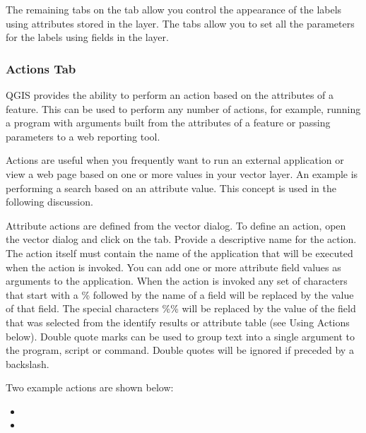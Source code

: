 The remaining tabs on the  tab allow you control the appearance of the
labels using attributes stored in the layer. The  tabs allow you to
set all the parameters for the labels using fields in the layer.

\subsubsection{Actions Tab}\label{label_actions}

QGIS provides the ability to perform an action based on the attributes of a
feature. This can be used to perform any number of actions, for example,
running a program with arguments built from the attributes of a feature or
passing parameters to a web reporting tool.

Actions are useful when you frequently want to run an external application or
view a web page based on one or more values in your vector layer. An example
is performing a search based on an attribute value. This concept is used in 
the following discussion.


Attribute actions are defined from the vector  dialog. To
define an action, open the vector  dialog and click on the
 tab. Provide a descriptive name for the action. The action
itself must contain the name of the application that will be executed when the
action is invoked. You can add one or more attribute field values as arguments
to the application. When the action is invoked any set of characters that
start with a \% followed by the name of a field will be replaced by the value of
that field. The special characters \%\% \index{\%\%}will be replaced by the value
of the field that was selected from the identify results or attribute table (see
Using Actions below).  Double quote marks can be used to group text into a
single argument to the program, script or command. Double quotes will be
ignored if preceded by a backslash.

Two example actions are shown below:

\begin{itemize}
  \item {}
  \item {}
\end{itemize}


